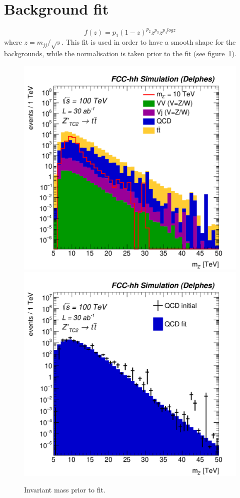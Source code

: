 \documentclass[a4paper,11pt]{article}
\begin{document}
\section{Background fit}%
\label{sec:app:bgfit}
\begin{equation}
f(z)=p_1(1-z)^{p_2}z^{p_3}z^{p_{4}logz}
\end{equation}
where $z=m_{jj}/\sqrt{s}$. This fit is used in order to have a smooth shape for the backgrounds, while the normalisation is taken prior to the fit (see figure~\ref{fig:hadronicresonances_nofit}).

\begin{figure}[!htb]\centering
\includegraphics[width=0.45\columnwidth]{Fig/Zptt/Mj1j2_pf08_MetCorr_sel8_nostack_log-eps-converted-to.pdf}
\includegraphics[width=0.45\columnwidth]{Fig/Zptt/Zptt_QCD_sel8_Mj1j2_pf08_MetCorr_fit-eps-converted-to.pdf}
\caption{Invariant mass prior to fit.}
\label{fig:hadronicresonances_nofit}
\end{figure}


\end{document}
